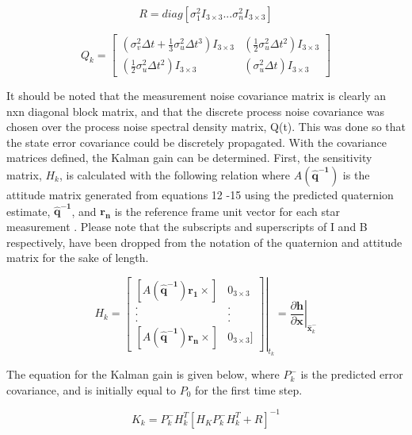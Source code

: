 \documentclass[12pt]{report}
\begin{document}
\begin{equation}
	R = diag[\sigma_1^2I_{3\times3} ... \sigma_n^2I_{3\times3}]
\end{equation}


\begin{equation}
	Q_k = \begin{bmatrix}
	(\sigma_v^2 \Delta t + \frac{1}{3}\sigma_u^2\Delta t^3)I_{3\times3} & (\frac{1}{2}\sigma_u^2\Delta t^2)I_{3\times3}\\
	(\frac{1}{2}\sigma_u^2\Delta t^2)I_{3\times3} & (\sigma_u^2\Delta t)I_{3\times3}
	
	\end{bmatrix}
\end{equation}


\noindent It should be noted that the measurement noise covariance matrix is clearly an nxn diagonal block matrix, and that the discrete process noise covariance was chosen over the process noise spectral density matrix, Q(t). This was done so that the state error covariance could be discretely propagated. With the covariance matrices defined, the Kalman gain can be determined. First, the sensitivity matrix, $H_k$, is calculated with the following relation where $A(\pmb{\hat{q}^{-1}})$ is the attitude matrix generated from equations 12 -15 using the predicted quaternion estimate, $\pmb{\hat{q}^{-1}}$, and $\pmb{r_n}$ is the reference frame unit vector for each star measurement . Please note that the subscripts and superscripts of I and B respectively, have been dropped from the notation of the quaternion and attitude matrix for the sake of length. 

\begin{equation}
	H_k = \left. \begin{bmatrix}
		[A(\pmb{\hat{q}^{-1}})\pmb{r_1}\times] & 0_{3\times3}\\
		. & . \\
		. & . \\
		. & . \\
		[A(\pmb{\hat{q}^{-1}})\pmb{r_n}\times] & 0_{3\times3}]
			
	\end{bmatrix}\right|_{t_k} =  \left. \frac{\partial\pmb{h}}{\partial\pmb{x}}\right|_{\hat{\pmb{x}}_k^-}
\end{equation}

\noindent The equation for the Kalman gain is given below, where $P_k^-$ is the predicted error covariance, and is initially equal to $P_0$ for the first time step.

\begin{equation}
	K_k = P_k^- H_k^T[H_KP_k^-H_k^T + R]^{-1}
\end{equation}
\end{document}
